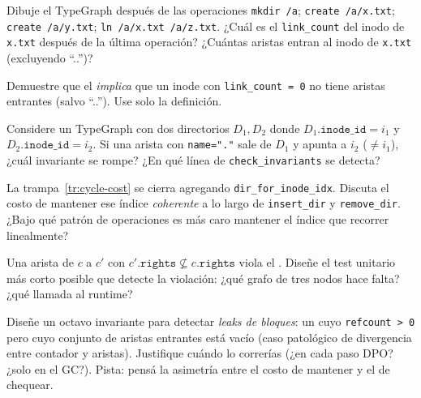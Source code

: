 \begin{ejercicio}[\dificultad{$\star\star$}]
\label{ej:tg-3}
Dibuje el TypeGraph después de las operaciones \texttt{mkdir /a};
\texttt{create /a/x.txt}; \texttt{create /a/y.txt}; \texttt{ln /a/x.txt
/a/z.txt}. ¿Cuál es el \texttt{link\_count} del inodo de \texttt{x.txt}
después de la última operación? ¿Cuántas aristas \econtains{} entran al
inodo de \texttt{x.txt} (excluyendo ``..'')?
\end{ejercicio}

\begin{ejercicio}[\dificultad{$\star\star$}]
\label{ej:tg-4}
Demuestre que el  \emph{implica} que un inode
con \texttt{link\_count = 0} no tiene aristas \econtains{} entrantes
(salvo ``..''). Use solo la definición.
\end{ejercicio}

\begin{ejercicio}[\dificultad{$\star\star$}]
\label{ej:tg-5}
Considere un TypeGraph con dos directorios $D_1, D_2$ donde
$D_1.\texttt{inode\_id} = i_1$ y $D_2.\texttt{inode\_id} = i_2$. Si una
arista \econtains{} con \texttt{name="."} sale de $D_1$ y apunta a
$i_2$ ($\neq i_1$), ¿cuál invariante se rompe? ¿En qué línea de
\texttt{check\_invariants} se detecta?
\end{ejercicio}

\begin{ejercicio}[\dificultad{$\star\star$}]
\label{ej:tg-6}
La trampa~\ref{tr:cycle-cost} se cierra agregando
\texttt{dir\_for\_inode\_idx}. Discuta el costo de mantener ese índice
\emph{coherente} a lo largo de \texttt{insert\_dir} y \texttt{remove\_dir}.
¿Bajo qué patrón de operaciones es más caro mantener el índice que
recorrer linealmente?
\end{ejercicio}

\begin{ejercicio}[\dificultad{$\star\star$}]
\label{ej:tg-7}
Una arista \edelegates{} de $c$ a $c'$ con $c'.\texttt{rights} \not\subseteq
c.\texttt{rights}$ viola el . Diseñe el
test unitario más corto posible que detecte la violación: ¿qué grafo de
tres nodos hace falta? ¿qué llamada al runtime?
\end{ejercicio}

\begin{ejercicio}[\dificultad{$\star\star\star$}]
\label{ej:tg-8}
Diseñe un octavo invariante para detectar \emph{leaks de bloques}: un
\NBlk{} cuyo \texttt{refcount > 0} pero cuyo conjunto de aristas
\epointsto{} entrantes está vacío (caso patológico de divergencia entre
contador y aristas). Justifique cuándo lo correrías (¿en cada paso DPO?
¿solo en el GC?). Pista: pensá la asimetría entre el costo de
mantener y el de chequear.
\end{ejercicio}

